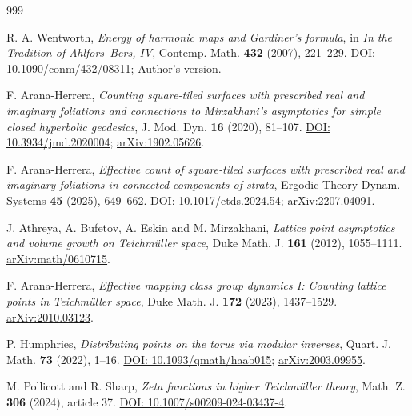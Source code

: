 \documentclass[11pt,a4paper]{article}
\numberwithin{equation}{section}
\theoremstyle{definition}
\theoremstyle{remark}
\begin{document}

\appendix

\clearpage

\clearpage
\begin{thebibliography}{999}
\setlength{\itemsep}{0pt}
\setlength{\parskip}{0pt}

R. A. Wentworth,
\emph{Energy of harmonic maps and Gardiner's formula},
in \emph{In the Tradition of Ahlfors--Bers, IV},
Contemp. Math. \textbf{432} (2007), 221--229.
\href{https://doi.org/10.1090/conm/432/08311}{DOI: 10.1090/conm/432/08311};
\href{https://math.umd.edu/~raw/papers/gardiner.pdf}{Author's version}.

F. Arana-Herrera,
\emph{Counting square-tiled surfaces with prescribed real and imaginary
foliations and connections to Mirzakhani's asymptotics for simple
closed hyperbolic geodesics},
J. Mod. Dyn. \textbf{16} (2020), 81--107.
\href{https://doi.org/10.3934/jmd.2020004}{DOI: 10.3934/jmd.2020004};
\href{https://arxiv.org/abs/1902.05626}{arXiv:1902.05626}.

F. Arana-Herrera,
\emph{Effective count of square-tiled surfaces with prescribed real and
imaginary foliations in connected components of strata},
Ergodic Theory Dynam. Systems \textbf{45} (2025), 649--662.
\href{https://doi.org/10.1017/etds.2024.54}{DOI: 10.1017/etds.2024.54};
\href{https://arxiv.org/abs/2207.04091}{arXiv:2207.04091}.

J. Athreya, A. Bufetov, A. Eskin and M. Mirzakhani,
\emph{Lattice point asymptotics and volume growth on Teichm\"uller space},
Duke Math. J. \textbf{161} (2012), 1055--1111.
\href{https://arxiv.org/abs/math/0610715}{arXiv:math/0610715}.

F. Arana-Herrera,
\emph{Effective mapping class group dynamics I: Counting lattice points
in Teichm\"uller space},
Duke Math. J. \textbf{172} (2023), 1437--1529.
\href{https://arxiv.org/abs/2010.03123}{arXiv:2010.03123}.

P. Humphries,
\emph{Distributing points on the torus via modular inverses},
Quart. J. Math. \textbf{73} (2022), 1--16.
\href{https://doi.org/10.1093/qmath/haab015}{DOI: 10.1093/qmath/haab015};
\href{https://arxiv.org/abs/2003.09955}{arXiv:2003.09955}.

M. Pollicott and R. Sharp,
\emph{Zeta functions in higher Teichm\"uller theory},
Math. Z. \textbf{306} (2024), article 37.
\href{https://doi.org/10.1007/s00209-024-03437-4}{DOI: 10.1007/s00209-024-03437-4}.


\end{thebibliography}
\end{document}
